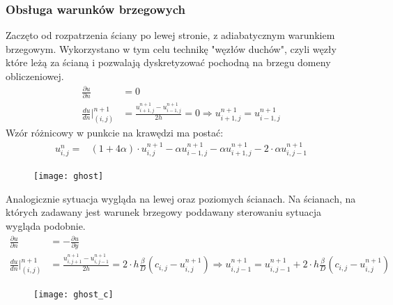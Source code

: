 \documentclass{article}
\begin{document}
\subsubsection{Obsługa warunków brzegowych}
Zaczęto od rozpatrzenia ściany po lewej stronie, z adiabatycznym warunkiem brzegowym. Wykorzystano w tym celu technikę "węzłów duchów", czyli węzły które leżą za ścianą i pozwalają dyskretyzować pochodną na brzegu domeny obliczeniowej. 
\begin{align*}
	\frac{\partial u}{\partial n} &= 0\\
	\frac{du}{dn}\Big\vert^{n+1}_{(i,j)}&= \frac{u_{i+1,j}^{n+1}-u_{i-1,j}^{n+1}}{2h} = 0\Rightarrow u_{i+1,j}^{n+1}=u_{i-1,j}^{n+1}
\end{align*}
Wzór różnicowy w punkcie na krawędzi ma postać:
\begin{align*}
		u_{i,j}^n=& (1+4\alpha)\cdot u_{i,j}^{n+1} - \alpha u_{i-1,j}^{n+1}-\alpha u_{i+1,j}^{n+1}-2\cdot\alpha u_{i,j-1}^{n+1}
\end{align*}
\begin{figure}[H]
	\centering
	\texttt{[image: ghost]}

	\label{fig:ghost}
\end{figure}
Analogicznie sytuacja wygląda na lewej oraz poziomych ścianach.
Na ścianach, na których zadawany jest warunek brzegowy poddawany sterowaniu sytuacja wygląda podobnie.
\begin{align*}
	\frac{\partial u}{\partial n} &= -\frac{\partial u}{\partial y}\\
	\frac{du}{dn}\Big\vert^{n+1}_{(i,j)}&= \frac{u_{i,j+1}^{n+1}-u_{i,j-1}^{n+1}}{2h} = 2\cdot h\frac{\beta}{D}(c_{i,j}-u_{i,j}^{n+1})\Rightarrow u_{i,j-1}^{n+1}=u_{i,j-1}^{n+1} + 2\cdot h\frac{\beta}{D}(c_{i,j}-u_{i,j}^{n+1})
\end{align*}
\begin{figure}[H]
	\centering
	\texttt{[image: ghost\_c]}
\end{figure}
\end{document}
